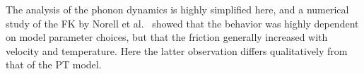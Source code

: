 The analysis of the phonon dynamics is highly simplified here, and a numerical study of the \acrshort{FK} by Norell et al.~\cite{FK2D} showed that the behavior was highly dependent on model parameter choices, but that the friction generally increased with velocity and temperature. Here the latter observation differs qualitatively from that of the \acrshort{PT} model.























